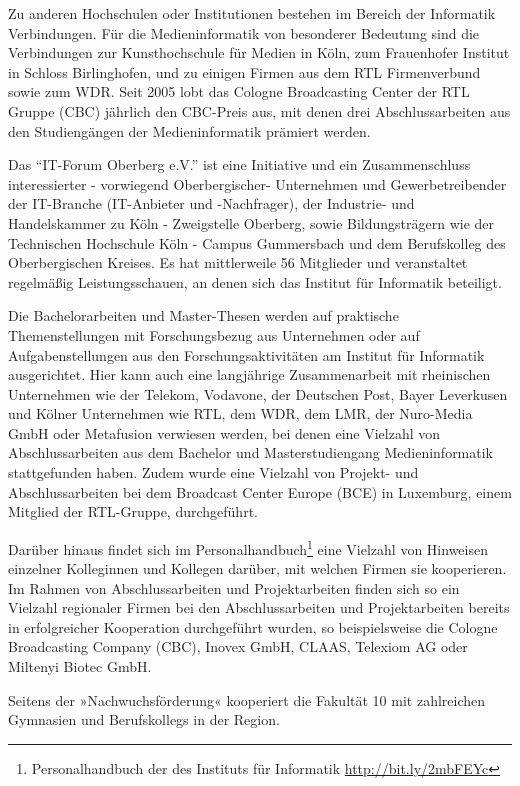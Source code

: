 Zu anderen Hochschulen oder Institutionen bestehen im Bereich der
Informatik Verbindungen. Für die Medieninformatik von besonderer
Bedeutung sind die Verbindungen zur Kunsthochschule für Medien in Köln,
zum Frauenhofer Institut in Schloss Birlinghofen, und zu einigen Firmen
aus dem RTL Firmenverbund sowie zum WDR. Seit 2005 lobt das Cologne
Broadcasting Center der RTL Gruppe (CBC) jährlich den CBC-Preis aus, mit
denen drei Abschlussarbeiten aus den Studiengängen der Medieninformatik
prämiert werden.

Das ``IT-Forum Oberberg e.V.'' ist eine Initiative und ein
Zusammenschluss interessierter - vorwiegend Oberbergischer- Unternehmen
und Gewerbetreibender der IT-Branche (IT-Anbieter und -Nachfrager), der
Industrie- und Handelskammer zu Köln - Zweigstelle Oberberg, sowie
Bildungsträgern wie der Technischen Hochschule Köln - Campus Gummersbach
und dem Berufskolleg des Oberbergischen Kreises. Es hat mittlerweile 56
Mitglieder und veranstaltet regelmäßig Leistungsschauen, an denen sich
das Institut für Informatik beteiligt.

Die Bachelorarbeiten und Master-Thesen werden auf praktische
Themenstellungen mit Forschungsbezug aus Unternehmen oder auf
Aufgabenstellungen aus den Forschungsaktivitäten am Institut für
Informatik ausgerichtet. Hier kann auch eine langjährige Zusammenarbeit
mit rheinischen Unternehmen wie der Telekom, Vodavone, der Deutschen
Post, Bayer Leverkusen und Kölner Unternehmen wie RTL, dem WDR, dem LMR,
der Nuro-Media GmbH oder Metafusion verwiesen werden, bei denen eine
Vielzahl von Abschlussarbeiten aus dem Bachelor und Masterstudiengang
Medieninformatik stattgefunden haben. Zudem wurde eine Vielzahl von
Projekt- und Abschlussarbeiten bei dem Broadcast Center Europe (BCE) in
Luxemburg, einem Mitglied der RTL-Gruppe, durchgeführt.

Darüber hinaus findet sich im Personalhandbuch\footnote{Personalhandbuch
  der des Instituts für Informatik
  \href{http://bit.ly/2mpcbWN}{http://bit.ly/2mbFEYc}} eine Vielzahl von
Hinweisen einzelner Kolleginnen und Kollegen darüber, mit welchen Firmen
sie kooperieren. Im Rahmen von Abschlussarbeiten und Projektarbeiten
finden sich so ein Vielzahl regionaler Firmen bei den Abschlussarbeiten
und Projektarbeiten bereits in erfolgreicher Kooperation durchgeführt
wurden, so beispielsweise die Cologne Broadcasting Company (CBC), Inovex
GmbH, CLAAS, Telexiom AG oder Miltenyi Biotec GmbH.

Seitens der »Nachwuchsförderung« kooperiert die Fakultät 10 mit
zahlreichen Gymnasien und Berufskollegs in der Region.

